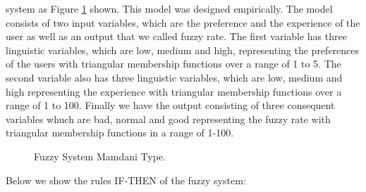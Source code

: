system \cite{mamdani1975experiment} \cite{mamdani1974application} as Figure
\ref{fig:fis01} shown. This model was designed empirically. The model consists
of two input variables, which are the preference and the experience of the user
as well as an output that we called fuzzy rate. The first variable has three
linguistic variables, which are low, medium and high, representing the
preferences of the users with triangular membership functions over a range of 1
to 5. The second variable also has three linguistic variables, which are low, medium
and high representing the experience with triangular membership functions over a
range of 1 to 100. Finally we have the output consisting of three consequent
variables whuch are bad, normal and good representing the fuzzy rate with triangular
membership functions in a range of 1-100.
\begin{figure}
\captionsetup{justification=centering,margin=2cm}
\centering
\setlength\fboxsep{0pt}
\setlength\fboxrule{0.7pt}
\caption{Fuzzy System Mamdani Type.}
\label{fig:fis01}
\end{figure}

Below we show the rules IF-THEN of the fuzzy system:

